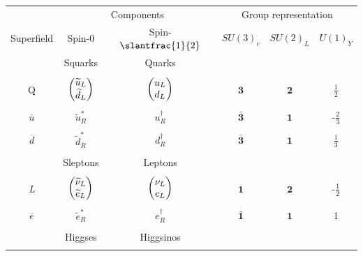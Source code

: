 \begin{table}
  \begin{tabular}{cccccc}
    \toprule
                   & \multicolumn{2}{c}{Components}                  & \multicolumn{3}{c}{Group representation} \\ \cmidrule(r){2-3}\cmidrule(l){4-6}
    Superfield     & Spin-0                                          & Spin-$\slantfrac{1}{2}$                                                        & $SU(3)_c$          & $SU(2)_L$    & $U(1)_Y$\\\midrule
                   & Squarks                                         & Quarks                                                                         &                    &              & \\ \cmidrule(r){2-3}\\
    Q              & $\begin{pmatrix} \widetilde{u}_L \\ \widetilde{d}_L\end{pmatrix}$   & $\begin{pmatrix} u_L \\ d_L\end{pmatrix}$                                                          & $\mathbf{3}$       & $\mathbf{2}$ & $\frac{1}{2}$\\\\
    $\overline{u}$ & $\tilde{u}_R^*$                                 & $u_R^\dagger$                                                                  & $\bar{\mathbf{3}}$ & $\mathbf{1}$ & -$\frac{2}{3}$\\\\
    $\overline{d}$ & $\tilde{d}_R^*$                                 & $d_R^\dagger$                                                                  & $\bar{\mathbf{3}}$ & $\mathbf{1}$ & $\frac{1}{3}$\\\\\cmidrule{2-3}
                   & Sleptons                                        & Leptons                                                                        &                    &              & \\ \cmidrule{2-3}\\
    \emph{L}       & $\begin{pmatrix} \widetilde{\nu}_L \\ \widetilde{e}_L\end{pmatrix}$ & $\begin{pmatrix} \nu_L \\ e_L\end{pmatrix}$                                                        & $\mathbf{1}$       & $\mathbf{2}$ & -$\frac{1}{2}$\\\\
    $\overline{e}$ & $\tilde{e}_R^*$                                 & $e_R^\dagger$                                                                  & $\bar{\mathbf{1}}$ & $\mathbf{1}$ & $1$\\\\\cmidrule{2-3}
                   & Higgses                                         & Higgsinos                                                                      &                    &              & \\ \cmidrule{2-3}\\

\end{tabular}
\end{table}
